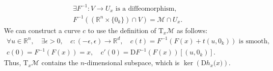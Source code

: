 \documentclass[12pt,dvipdfmx]{article}
\theoremstyle{plain}
\begin{document}
{\begin{gather*}
        \exists F^{-1}\colon V \to U_x \text{ is a diffeomorphism}, \\
        F^{-1}((\mathbb{R}^{n} \times \{0_k\}) \cap V) = \mathcal{M} \cap U_x.
    \end{gather*}
    We can construct a curve $c$ to use the definition of $\mathrm{T}_x \mathcal{M}$ as follows:
    \begin{gather*}
        \forall u \in \mathbb{R}^n, \quad
        \exists \epsilon > 0, \quad
        c\colon (-\epsilon, \epsilon) \to \mathbb{R}^d, \quad c(t) = F^{-1}(F(x) + t (u, 0_k)) \text{ is smooth},\\
        c(0) = F^{-1}(F(x)) = x, \quad c'(0) =
        \mathrm{D} F^{-1}(F(x)) [(u, 0_k)].
    \end{gather*}
    Thus, $\mathrm{T}_x \mathcal{M}$ contains the $n$-dimensional subspace, which is $\ker(\mathrm{D} h_x \lparen x \rparen)$.
}

\end{document}
